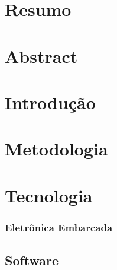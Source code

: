 % 

\chapter{Resumo} %


\chapter{Abstract} %




\chapter{Introdução} %


\chapter{Metodologia}


\chapter{Tecnologia}

\nocite{torres_2006}
\nocite{circuitar_2013}

\subsection{Eletrônica Embarcada} %


\section{Software} %

